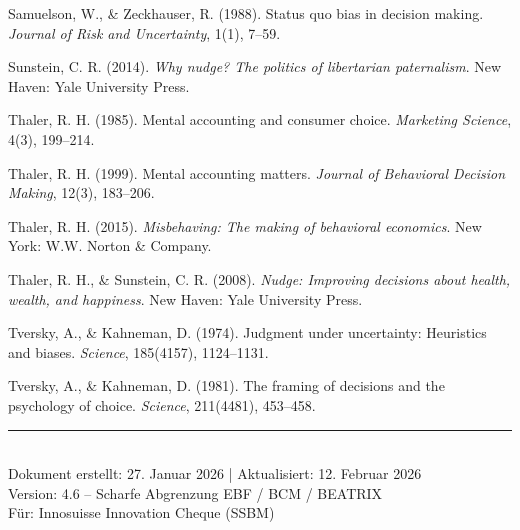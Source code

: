 \documentclass[11pt,a4paper]{article}
\begin{document}
\vspace{0.3cm}
Samuelson, W., \& Zeckhauser, R. (1988). Status quo bias in decision making. \textit{Journal of Risk and Uncertainty}, 1(1), 7--59.

\vspace{0.3cm}
Sunstein, C. R. (2014). \textit{Why nudge? The politics of libertarian paternalism}. New Haven: Yale University Press.

\vspace{0.3cm}
Thaler, R. H. (1985). Mental accounting and consumer choice. \textit{Marketing Science}, 4(3), 199--214.

\vspace{0.3cm}
Thaler, R. H. (1999). Mental accounting matters. \textit{Journal of Behavioral Decision Making}, 12(3), 183--206.

\vspace{0.3cm}
Thaler, R. H. (2015). \textit{Misbehaving: The making of behavioral economics}. New York: W.W. Norton \& Company.

\vspace{0.3cm}
Thaler, R. H., \& Sunstein, C. R. (2008). \textit{Nudge: Improving decisions about health, wealth, and happiness}. New Haven: Yale University Press.

\vspace{0.3cm}
Tversky, A., \& Kahneman, D. (1974). Judgment under uncertainty: Heuristics and biases. \textit{Science}, 185(4157), 1124--1131.

\vspace{0.3cm}
Tversky, A., \& Kahneman, D. (1981). The framing of decisions and the psychology of choice. \textit{Science}, 211(4481), 453--458.

\vspace{2cm}

\begin{center}
\rule{0.4\textwidth}{0.5pt}\\[0.5em]
{\small Dokument erstellt: 27. Januar 2026 | Aktualisiert: 12. Februar 2026}\\
{\small Version: 4.6 -- Scharfe Abgrenzung EBF / BCM / BEATRIX}\\
{\small Für: Innosuisse Innovation Cheque (SSBM)}
\end{center}
\end{document}
